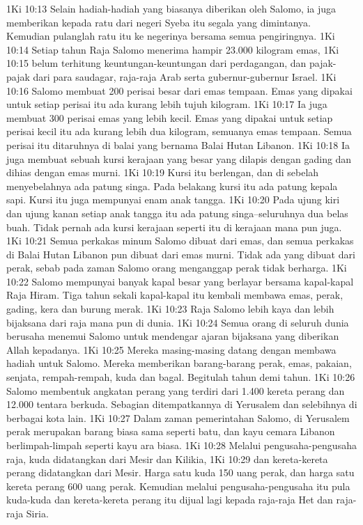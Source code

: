 1Ki 10:13  Selain hadiah-hadiah yang biasanya diberikan oleh Salomo, ia juga memberikan kepada ratu dari negeri Syeba itu segala yang dimintanya. Kemudian pulanglah ratu itu ke negerinya bersama semua pengiringnya.
1Ki 10:14  Setiap tahun Raja Salomo menerima hampir 23.000 kilogram emas,
1Ki 10:15  belum terhitung keuntungan-keuntungan dari perdagangan, dan pajak-pajak dari para saudagar, raja-raja Arab serta gubernur-gubernur Israel.
1Ki 10:16  Salomo membuat 200 perisai besar dari emas tempaan. Emas yang dipakai untuk setiap perisai itu ada kurang lebih tujuh kilogram.
1Ki 10:17  Ia juga membuat 300 perisai emas yang lebih kecil. Emas yang dipakai untuk setiap perisai kecil itu ada kurang lebih dua kilogram, semuanya emas tempaan. Semua perisai itu ditaruhnya di balai yang bernama Balai Hutan Libanon.
1Ki 10:18  Ia juga membuat sebuah kursi kerajaan yang besar yang dilapis dengan gading dan dihias dengan emas murni.
1Ki 10:19  Kursi itu berlengan, dan di sebelah menyebelahnya ada patung singa. Pada belakang kursi itu ada patung kepala sapi. Kursi itu juga mempunyai enam anak tangga.
1Ki 10:20  Pada ujung kiri dan ujung kanan setiap anak tangga itu ada patung singa--seluruhnya dua belas buah. Tidak pernah ada kursi kerajaan seperti itu di kerajaan mana pun juga.
1Ki 10:21  Semua perkakas minum Salomo dibuat dari emas, dan semua perkakas di Balai Hutan Libanon pun dibuat dari emas murni. Tidak ada yang dibuat dari perak, sebab pada zaman Salomo orang menganggap perak tidak berharga.
1Ki 10:22  Salomo mempunyai banyak kapal besar yang berlayar bersama kapal-kapal Raja Hiram. Tiga tahun sekali kapal-kapal itu kembali membawa emas, perak, gading, kera dan burung merak.
1Ki 10:23  Raja Salomo lebih kaya dan lebih bijaksana dari raja mana pun di dunia.
1Ki 10:24  Semua orang di seluruh dunia berusaha menemui Salomo untuk mendengar ajaran bijaksana yang diberikan Allah kepadanya.
1Ki 10:25  Mereka masing-masing datang dengan membawa hadiah untuk Salomo. Mereka memberikan barang-barang perak, emas, pakaian, senjata, rempah-rempah, kuda dan bagal. Begitulah tahun demi tahun.
1Ki 10:26  Salomo membentuk angkatan perang yang terdiri dari 1.400 kereta perang dan 12.000 tentara berkuda. Sebagian ditempatkannya di Yerusalem dan selebihnya di berbagai kota lain.
1Ki 10:27  Dalam zaman pemerintahan Salomo, di Yerusalem perak merupakan barang biasa sama seperti batu, dan kayu cemara Libanon berlimpah-limpah seperti kayu ara biasa.
1Ki 10:28  Melalui pengusaha-pengusaha raja, kuda didatangkan dari Mesir dan Kilikia,
1Ki 10:29  dan kereta-kereta perang didatangkan dari Mesir. Harga satu kuda 150 uang perak, dan harga satu kereta perang 600 uang perak. Kemudian melalui pengusaha-pengusaha itu pula kuda-kuda dan kereta-kereta perang itu dijual lagi kepada raja-raja Het dan raja-raja Siria.
